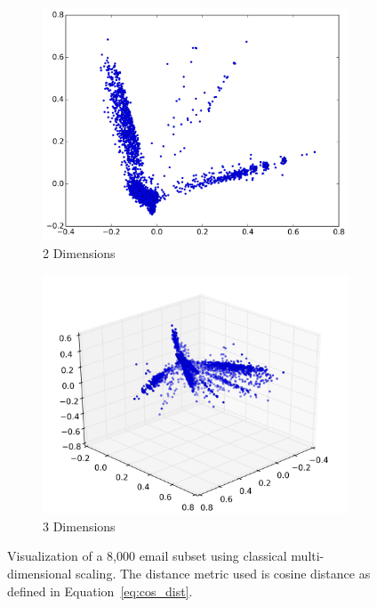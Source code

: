 \documentclass[12pt]{article}
\theoremstyle{definition}
\theoremstyle{algodesc}
\begin{document}
\begin{figure}[htb] \centering
  \begin{subfigure}[t]{.49\linewidth}
    \includegraphics[width=\linewidth]{../images/mds_2d.png}
    \caption{2 Dimensions} \label{fig:mds:2d}
  \end{subfigure}
  \begin{subfigure}[t]{.49\linewidth}
    \includegraphics[width=\linewidth]{../images/mds_3d_1.png}
    \caption{3 Dimensions} \label{fig:mds:3d}
  \end{subfigure}
  \caption{Visualization of a 8,000 email subset using classical multi-dimensional scaling. The distance metric used is cosine distance as defined in Equation~\ref{eq:cos_dist}.}
  \label{fig:mds}
\end{figure}
\end{document}
